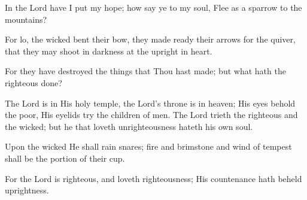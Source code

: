 In the Lord have I put my hope; how say ye to my soul, Flee as a sparrow to the mountains?

For lo, the wicked bent their bow, they made ready their arrows for the quiver, that they may shoot in darkness at the upright in heart.

For they have destroyed the things that Thou hast made; but what hath the righteous done?

The Lord is in His holy temple, the Lord’s throne is in heaven; His eyes behold the poor, His eyelids try the children of men. The Lord trieth the righteous and the wicked; but he that loveth unrighteousness hateth his own soul.

Upon the wicked He shall rain snares; fire and brimstone and wind of tempest shall be the portion of their cup.

For the Lord is righteous, and loveth righteousness; His countenance hath beheld uprightness.
